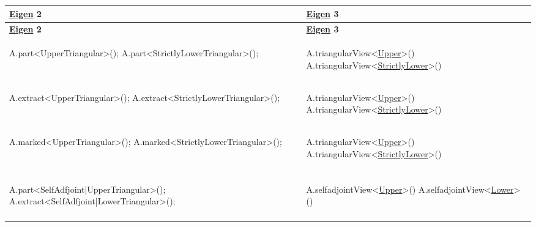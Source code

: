 \tabulinesep=1mm
\begin{longtabu} spread 0pt [c]{*{2}{|X[-1]}|}
\hline
\rowcolor{\tableheadbgcolor}\textbf{ \hyperlink{namespace_eigen}{Eigen} 2}&\textbf{ \hyperlink{namespace_eigen}{Eigen} 3 }\\
\endfirsthead
\hline
\endfoot
\hline
\rowcolor{\tableheadbgcolor}\textbf{ \hyperlink{namespace_eigen}{Eigen} 2}&\textbf{ \hyperlink{namespace_eigen}{Eigen} 3 }\\
\endhead

\begin{DoxyCode}
A.part<UpperTriangular>();
A.part<StrictlyLowerTriangular>(); 
\end{DoxyCode}
 &
\begin{DoxyCode}
A.triangularView<\hyperlink{group__enums_gga39e3366ff5554d731e7dc8bb642f83cda6bcb58be3b8b8ec84859ce0c5ac0aaec}{Upper}>()
A.triangularView<\hyperlink{group__enums_gga39e3366ff5554d731e7dc8bb642f83cda00aa79c8865ada1584c4d57bcd93299f}{StrictlyLower}>()
\end{DoxyCode}
 \\

\begin{DoxyCode}
A.extract<UpperTriangular>();
A.extract<StrictlyLowerTriangular>();
\end{DoxyCode}
 &
\begin{DoxyCode}
A.triangularView<\hyperlink{group__enums_gga39e3366ff5554d731e7dc8bb642f83cda6bcb58be3b8b8ec84859ce0c5ac0aaec}{Upper}>()
A.triangularView<\hyperlink{group__enums_gga39e3366ff5554d731e7dc8bb642f83cda00aa79c8865ada1584c4d57bcd93299f}{StrictlyLower}>()
\end{DoxyCode}
 \\

\begin{DoxyCode}
A.marked<UpperTriangular>();
A.marked<StrictlyLowerTriangular>();
\end{DoxyCode}
 &
\begin{DoxyCode}
A.triangularView<\hyperlink{group__enums_gga39e3366ff5554d731e7dc8bb642f83cda6bcb58be3b8b8ec84859ce0c5ac0aaec}{Upper}>()
A.triangularView<\hyperlink{group__enums_gga39e3366ff5554d731e7dc8bb642f83cda00aa79c8865ada1584c4d57bcd93299f}{StrictlyLower}>()
\end{DoxyCode}
 \\
\\

\begin{DoxyCode}
A.part<SelfAdfjoint|UpperTriangular>();
A.extract<SelfAdfjoint|LowerTriangular>();
\end{DoxyCode}
 &
\begin{DoxyCode}
A.selfadjointView<\hyperlink{group__enums_gga39e3366ff5554d731e7dc8bb642f83cda6bcb58be3b8b8ec84859ce0c5ac0aaec}{Upper}>()
A.selfadjointView<\hyperlink{group__enums_gga39e3366ff5554d731e7dc8bb642f83cda891792b8ed394f7607ab16dd716f60e6}{Lower}>()
\end{DoxyCode}
 \\
\\


\end{longtabu}
